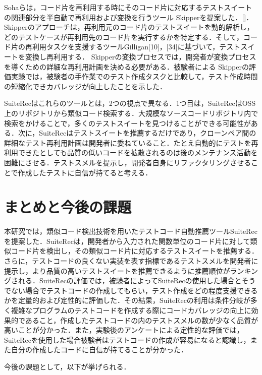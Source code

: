 \documentclass[12pt]{jarticle} %
\begin{document}
Sohaらは，コード片を再利用する時にそのコード片に対応するテストスイートの関連部分を半自動で再利用および変換を行うツール{ \sf Skipper}を提案した．[]．{ \sf Skipper}のアプローチは，再利用元のコード片のテストスイートを動的解析し，どのテストケースが再利用先のコード片を実行するかを特定する．そして，コード片の再利用タスクを支援するツール{\sf Gilligan}[10]，[34]に基づいて，テストスイートを変換し再利用する．{ \sf Skipper}の変換プロセスでは，開発者が変換プロセスを導くための詳細な再利用計画を決める必要がある．被験者による{ \sf Skipper}の評価実験では，被験者の手作業でのテスト作成タスクと比較して，テスト作成時間の短縮化できカバレッジが向上したことを示した．

{\sf SuiteRec}はこれらのツールとは，2つの視点で異なる．1つ目は，{\sf SuiteRec}はOSS上のリポジトリから類似コード検索する．大規模なソースコードリポジトリ内で検索をかけることで，多くのテストスイートを見つけることができる可能性がある．次に，{\sf SuiteRec}はテストスイートを推薦するだけであり，クローンペア間の詳細なテスト再利用計画は開発者に委ねていること．たとえ自動的にテストを再利用できたとしても品質の低いコードを拡散されるのは後のメンテナンス活動を困難にさせる．テストスメルを提示し，開発者自身にリファクタリングさせることで作成したテストに自信が持てると考える．

\newpage
\section{まとめと今後の課題}
本研究では，類似コード検出技術を用いたテストコード自動推薦ツール{\sf SuiteRec}を提案した．{\sf SuiteRec}は，開発者から入力された関数単位のコード片に対して類似コード片を検出し，その類似コード片に対応するテストスイートを推薦する．さらに，テストコードの良くない実装を表す指標であるテストスメルを開発者に提示し，より品質の高いテストスイートを推薦できるように推薦順位がランキングされる．{\sf SuiteRec}の評価では，被験者によって{\sf SuiteRec}の使用した場合とそうでない場合でテストコードの作成してもらい，テスト作成をどの程度支援できるかを定量的および定性的に評価した．その結果，{\sf SuiteRec}の利用は条件分岐が多く複雑なプログラムのテストコードを作成する際にコードカバレッジの向上に効果的であること，作成したテストコードの内のテストスメルの数が少なく品質が高いことが分かった．また，実験後のアンケートによる定性的な評価では，{\sf SuiteRec}を使用した場合被験者はテストコードの作成が容易になると認識し，また自分の作成したコードに自信が持てることが分かった．

今後の課題として，以下が挙げられる．
\end{document}
